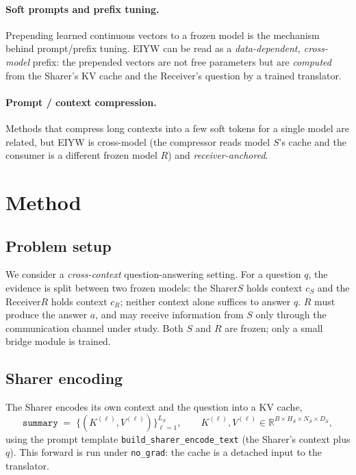 \documentclass[11pt]{article}
\newcommand{\method}{\textsc{EIYW}\xspace}      %
\newcommand{\sharer}{\textsf{Sharer}\xspace}
\newcommand{\receiver}{\textsf{Receiver}\xspace}
\begin{document}
\paragraph{Soft prompts and prefix tuning.} Prepending learned continuous
vectors to a frozen model is the mechanism behind prompt/prefix
tuning. \method can be read as a \emph{data-dependent, cross-model} prefix: the
prepended vectors are not free parameters but are \emph{computed} from the
\sharer's KV cache and the \receiver's question by a trained translator.

\paragraph{Prompt / context compression.} Methods that compress long contexts
into a few soft tokens for a single model are related, but \method is
cross-model (the compressor reads model $S$'s cache and the consumer is a
different frozen model $R$) and \emph{receiver-anchored}.

\section{Method}\label{sec:method}
\subsection{Problem setup}
We consider a \emph{cross-context} question-answering setting. For a question
$q$, the evidence is split between two frozen models: the \sharer $S$ holds
context $c_S$ and the \receiver $R$ holds context $c_R$; neither context alone
suffices to answer $q$. $R$ must produce the answer $a$, and may receive
information from $S$ only through the communication channel under study. Both $S$
and $R$ are frozen; only a small bridge module is trained.

\subsection{Sharer encoding}
The \sharer encodes its own context and the question into a KV cache,
\[
  \texttt{summary} \;=\; \{(K^{(\ell)}, V^{(\ell)})\}_{\ell=1}^{L_S},
  \qquad K^{(\ell)},V^{(\ell)}\in\mathbb{R}^{B\times H_S\times N_S\times D_S},
\]
using the prompt template \texttt{build\_sharer\_encode\_text} (the \sharer's
context plus $q$). This forward is run under \texttt{no\_grad}: the cache is a
detached input to the translator.
\end{document}

